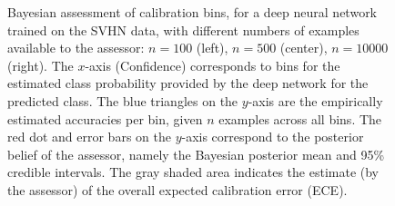 \documentclass{article}
\begin{document}
\begin{figure}[h]
 \centering
    
\caption{Bayesian assessment of calibration bins, for a deep neural network trained on the SVHN data, with different numbers of examples available to the assessor: $n=100$ (left), $n=500$ (center), $n=10000$ (right). The $x$-axis (Confidence) corresponds to bins for the estimated class probability provided by the deep network for the predicted class. The blue triangles on the $y$-axis are the empirically estimated accuracies per bin, given $n$ examples across all bins. The red dot and error bars on the $y$-axis correspond to the posterior belief of the assessor, namely the Bayesian posterior mean and 95\% credible intervals. The gray shaded area indicates the estimate (by the assessor) of the overall expected calibration error (ECE).}  
\label{fig:betacalibration}
\end{figure}
\end{document}
